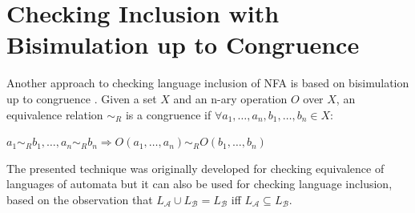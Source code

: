 \section{Checking Inclusion with Bisimulation up to Congruence}
\label{sectionCongr}
Another approach to checking language inclusion of NFA is based on bisimulation up to congruence \cite{popl13}.
Given a set $X$ and an n-ary operation $O$ over $X$, an equivalence relation $\sim_R$ is a congruence if $\forall a_1,\ldots,a_n,b_1,\ldots,b_n\in X$:
		\begin{description}
			\item $a_1 \sim_{R} b_1,\ldots,a_n \sim_{R} b_n \Rightarrow O(a_1,\ldots,a_n) \sim_{R} O(b_1,\ldots,b_n)$
		\end{description}

The presented technique was originally developed for checking equivalence of languages of automata but it can
also be used for checking language inclusion, based on the observation that $L_\mathcal{A}\cup L_\mathcal{B}= L_\mathcal{B}$ iff 
$L_\mathcal{A}\subseteq L_\mathcal{B}$.

